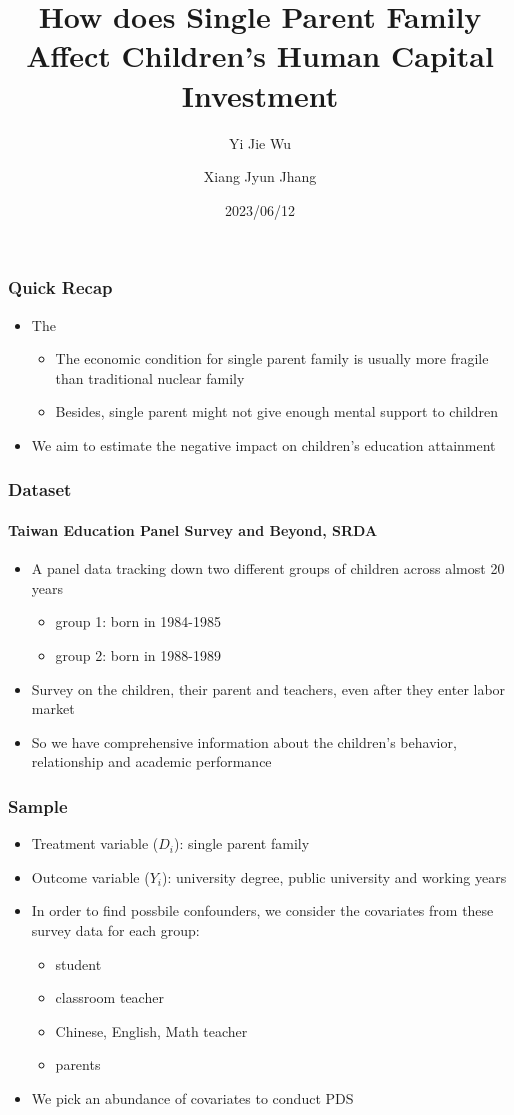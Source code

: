 \documentclass{beamer}
\title{How does Single Parent Family Affect Children's Human Capital Investment}
\author[Yi Jie Wu, Xiang Jyun Jhang]{Yi Jie Wu\inst{1} \and Xiang Jyun Jhang\inst{2}}
\institute[NTU]
{
    \inst{1}
    Department of Economics \\
    National Taiwan University
    \and
    \inst{2}
    Department of Economics \\ 
    National Taiwan University
}
\date{2023/06/12}
\begin{document}
\frame{\titlepage}


\begin{frame} %
\frametitle{Quick Recap}
\begin{itemize}
    \item The
    \begin{itemize}
        \item The economic condition for single parent family is usually more fragile than traditional nuclear family
        \item Besides, single parent might not give enough mental support to children
    \end{itemize}
    \item We aim to estimate the negative impact on children's education attainment
\end{itemize}
\end{frame}


\begin{frame} %
\frametitle{Dataset}
\framesubtitle{Taiwan Education Panel Survey and Beyond, SRDA}
\begin{itemize}
    \item A panel data tracking down two different groups of children across almost 20 years
    \begin{itemize}
        \item group 1: born in 1984-1985
        \item group 2: born in 1988-1989
    \end{itemize}
    \item Survey on the children, their parent and teachers, even after they enter labor market
    \item So we have comprehensive information about the children's behavior, relationship and academic performance
\end{itemize}
\end{frame}


\begin{frame} %
\frametitle{Sample}
\begin{itemize}
    \item Treatment variable ($D_i$): single parent family
    \item Outcome variable ($Y_i$): university degree, public university and working years
    \item In order to find possbile confounders, we consider the covariates from these survey data for each group:
    \begin{itemize}
        \item student
        \item classroom teacher
        \item Chinese, English, Math teacher
        \item parents
    \end{itemize}
    \item We pick an abundance of covariates to conduct PDS
\end{itemize}
\end{frame}
\end{document}
